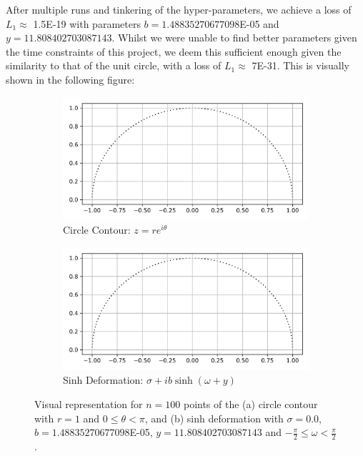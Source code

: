 \documentclass[a4paper]{report}
\begin{document}
After multiple runs and tinkering of the hyper-parameters, we achieve a loss of $L_1 \approx$ 1.5E-19 with parameters $b = 1.48835270677098$E-05 and $y = 11.808402703087143$. Whilst we were unable to find better parameters given the time constraints of this project, we deem this sufficient enough given the similarity to that of the unit circle, with a loss of $L_1 \approx$ 7E-31. This is visually shown in the following figure:
\begin{figure}[H]
    \begin{subfigure}{.5\linewidth}
      \includegraphics[width=\linewidth]{images/gd/unit_circle.png}
      \caption{Circle Contour: $z = re^{i\theta}$}
      \label{fig:circle_contour}
    \end{subfigure}\hfill
    \begin{subfigure}{.5\linewidth}
      \includegraphics[width=\linewidth]{images/gd/best_params.png}
      \caption{Sinh Deformation: $\sigma + ib\sinh(\omega + y)$}
      \label{fig:perfect_sinh}
    \end{subfigure}
    
    \caption{Visual representation for $n = 100$ points of the (a) circle contour with $r = 1$ and $0 \leq \theta < \pi$, and (b) sinh deformation with $\sigma = 0.0$, $b = 1.48835270677098$E-05, $y = 11.808402703087143$ and $-\frac{\pi}{2} \leq \omega < \frac{\pi}{2}$.}
\end{figure}
\end{document}
